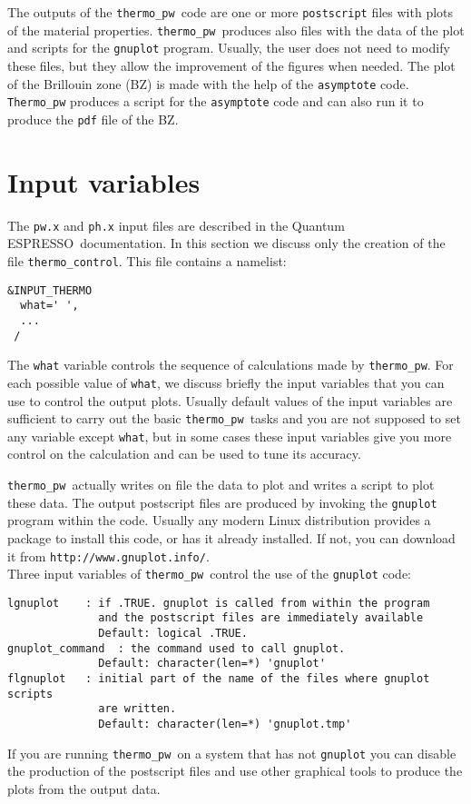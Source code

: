 \documentclass[12pt,a4paper]{article}
\def\qe{{\sc Quantum ESPRESSO}}
\def\thermo{\texttt{thermo\_pw}}
\begin{document}
The outputs of the \thermo\ code are one or more \texttt{postscript} files 
with plots of the material properties. \thermo\ produces also files with 
the data of 
the plot and scripts for the \texttt{gnuplot} program. 
Usually, the user does not need to modify these files, but they allow 
the improvement of the figures when needed.
The plot of the Brillouin zone (BZ) is made with the help of the 
\texttt{asymptote} code. \texttt{Thermo\_pw} produces a script 
for the \texttt{asymptote} code and can also run it to produce the \texttt{pdf}
file of the BZ. 

\newpage

\section{\color{coral}Input variables}

The \texttt{pw.x} and \texttt{ph.x} input files are described in the \qe\ documentation.
In this section we discuss only the creation of the file
\texttt{thermo\_control}. This file contains a namelist:  
\begin{verbatim}
&INPUT_THERMO
  what=' ',
  ...
 /
\end{verbatim}
The \texttt{what} variable controls the sequence of calculations made
by \thermo. For each possible value of \texttt{what}, we discuss briefly the
input variables that you can use to control the output plots. Usually
default values of the input variables are sufficient to carry out  
the basic \thermo\ tasks and you are not supposed to set any variable except
\texttt{what}, but in some cases these input variables give you more control
on the calculation and can be used to tune its accuracy.

\thermo\ actually writes on file the data to plot and writes a script to plot
these data. The output postscript files are produced by invoking the 
\texttt{gnuplot} program within the code. Usually any modern Linux 
distribution provides a package to install this code, or has it already 
installed. If not, you can download it from 
\texttt{http://www.gnuplot.info/}. \\
Three input variables of \thermo\ control 
the use of the \texttt{gnuplot} code:

\begin{verbatim}
lgnuplot    : if .TRUE. gnuplot is called from within the program
              and the postscript files are immediately available
              Default: logical .TRUE.
gnuplot_command  : the command used to call gnuplot.
              Default: character(len=*) 'gnuplot'
flgnuplot   : initial part of the name of the files where gnuplot scripts 
              are written.
              Default: character(len=*) 'gnuplot.tmp'
\end{verbatim}
If you are running \thermo\ on a system that has not \texttt{gnuplot}
you can disable the production of the postscript files and use other
graphical tools to produce the plots from the output data. 
\end{document}
